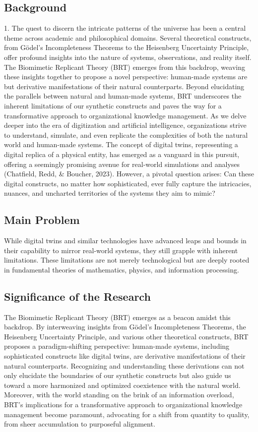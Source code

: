 \subsection{Background}
	   1. The quest to discern the intricate patterns of the universe has been a central theme across academic and philosophical domains. Several theoretical constructs, from Gödel's Incompleteness Theorems to the Heisenberg Uncertainty Principle, offer profound insights into the nature of systems, observations, and reality itself. The Biomimetic Replicant Theory (BRT) emerges from this backdrop, weaving these insights together to propose a novel perspective: human-made systems are but derivative manifestations of their natural counterparts. Beyond elucidating the parallels between natural and human-made systems, BRT underscores the inherent limitations of our synthetic constructs and paves the way for a transformative approach to organizational knowledge management.
As we delve deeper into the era of digitization and artificial intelligence, organizations strive to understand, simulate, and even replicate the complexities of both the natural world and human-made systems. The concept of digital twins, representing a digital replica of a physical entity, has emerged as a vanguard in this pursuit, offering a seemingly promising avenue for real-world simulations and analyses (Chatfield, Redd, & Boucher, 2023). However, a pivotal question arises: Can these digital constructs, no matter how sophisticated, ever fully capture the intricacies, nuances, and uncharted territories of the systems they aim to mimic?
\subsection{Main Problem}
While digital twins and similar technologies have advanced leaps and bounds in their capability to mirror real-world systems, they still grapple with inherent limitations. These limitations are not merely technological but are deeply rooted in fundamental theories of mathematics, physics, and information processing.
\subsection{Significance of the Research}
The Biomimetic Replicant Theory (BRT) emerges as a beacon amidst this backdrop. By interweaving insights from Gödel's Incompleteness Theorems, the Heisenberg Uncertainty Principle, and various other theoretical constructs, BRT proposes a paradigm-shifting perspective: human-made systems, including sophisticated constructs like digital twins, are derivative manifestations of their natural counterparts. Recognizing and understanding these derivations can not only elucidate the boundaries of our synthetic constructs but also guide us toward a more harmonized and optimized coexistence with the natural world. Moreover, with the world standing on the brink of an information overload, BRT's implications for a transformative approach to organizational knowledge management become paramount, advocating for a shift from quantity to quality, from sheer accumulation to purposeful alignment.

